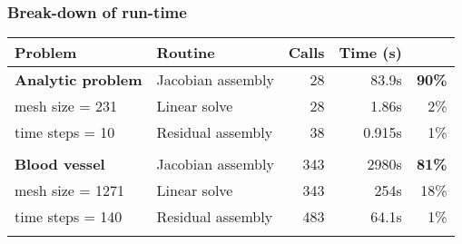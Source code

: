 \begin{frame}
  \frametitle{Break-down of run-time}

  \small
  \begin{tabular}{|l|l|r|r|r|}
    \hline
    \bf{Problem} & \bf{Routine} & \bf{Calls} & \bf{Time} (s) & \\
    \hline
    \bf{Analytic problem} &Jacobian assembly&   28 & 83.9s & \textbf{90\%} \\
    mesh size = 231        &Linear solve&        28 & 1.86s & 2\% \\
    time steps = 10       &Residual assembly&   38 & 0.915s  & 1\% \\
    &&&&\\
    \hline
    \bf{Blood vessel} &Jacobian assembly&   343 & 2980s & \textbf{81\%} \\
    mesh size = 1271    &Linear solve&        343 & 254s & 18\% \\
    time steps = 140    &Residual assembly&   483 & 64.1s &  1\%  \\
    &&&&\\
    \hline
  \end{tabular}
  \normalsize

\end{frame}
